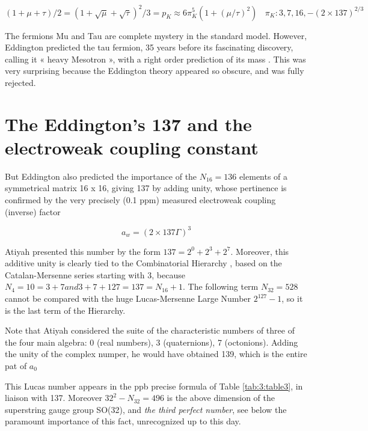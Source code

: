 \documentclass[a4paper,9pt]{article}
\begin{document}
\begin{equation}
(1 + \mu + \tau)/2 = (1 + \sqrt{\mu} + \sqrt{\tau})^2/3 = p_K \approx 6\pi_K^5 (1+(\mu / \tau)^2) ~~~~\pi_K: 3,7,16,-(2\times 137)^{2/3}
\end{equation}

The fermions Mu and Tau are complete mystery in the standard model. However, Eddington predicted the tau fermion, 35 years before its fascinating discovery, calling it « heavy Mesotron », with a right order prediction of its mass \cite{Eddington}.  This was very surprising because the Eddington theory appeared so obscure, and was fully rejected.

     




\section{The Eddington's 137 and the electroweak coupling constant}

But Eddington also predicted the importance of the $N_{16} = 136$ elements of a symmetrical matrix 16 x 16, giving 137 by adding unity, whose pertinence is confirmed by the very precisely (0.1 ppm) measured electroweak coupling (inverse) factor 

\begin{equation}
a_w = (2\times137 \Gamma)^3
\end{equation}
 
Atiyah presented this number by the form $137 = 2^0 + 2^3 + 2^7$. Moreover, this additive unity is clearly tied to the Combinatorial Hierarchy \cite{Bastin}, based on the Catalan-Mersenne series starting with 3, because $N_4 = 10 = 3 + 7 and 3+7 + 127 = 137 = N_{16} + 1$. The following term $N_{32}  = 528$ cannot be compared with the huge Lucas-Mersenne Large Number $2^{127}- 1$, so it is the last term of the Hierarchy.


Note that Atiyah considered the suite of the characteristic numbers of three of the four main algebra: 0 (real numbers), 3 (quaternions), 7 (octonions). Adding the unity of the complex numper, he would have obtained 139, which is the entire pat of $a_0$ 

This Lucas number appears in the ppb precise formula of Table \ref{tab:3:table3}, in liaison with 137. Moreover $32^2 - N_{32} =  496$ is the above dimension of the superstring gauge group SO(32), and \textit {the third perfect number}, see below the paramount importance of this fact, unrecognized up to this day.
\end{document}
